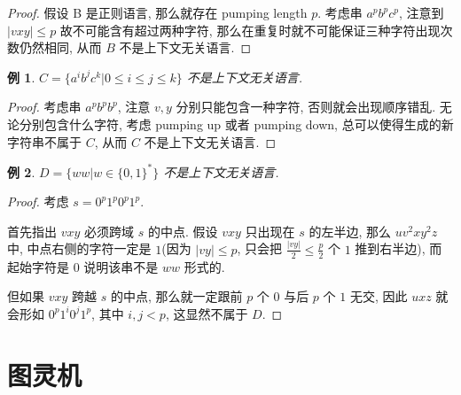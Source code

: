 \documentclass[8pt]{article}
\theoremstyle{compact}
\newtheorem{example}{例}
\def\le{\leqslant}
\begin{document}
\begin{proof}
	假设 B 是正则语言, 那么就存在 pumping length $p$. 考虑串 $a^pb^pc^p$, 注意到 $|vxy| \le p$ 故不可能含有超过两种字符, 那么在重复时就不可能保证三种字符出现次数仍然相同, 从而 $B$ 不是上下文无关语言.
\end{proof}
\begin{example}
	$C = \{a^ib^jc^k | 0 \le i \le j \le k\}$ 不是上下文无关语言.
\end{example}
\begin{proof}
	考虑串 $a^{p}b^{p}b^{p}$, 注意 $v, y$ 分别只能包含一种字符, 否则就会出现顺序错乱. 无论分别包含什么字符, 考虑 pumping up 或者 pumping down, 总可以使得生成的新字符串不属于 $C$, 从而 $C$ 不是上下文无关语言.
\end{proof}
\begin{example}
	$D = \{ww | w \in \{0, 1\}^*\}$ 不是上下文无关语言. 
\end{example}
\begin{proof}
	考虑 $s = 0^p1^p0^p1^p$. 

	首先指出 $vxy$ 必须跨域 $s$ 的中点. 假设 $vxy$ 只出现在 $s$ 的左半边, 那么 $uv^2xy^2z$ 中, 中点右侧的字符一定是 $1$(因为 $|vy| \le p$, 只会把 $\frac{|vy|}{2} \le \frac p2$ 个 $1$ 推到右半边), 而起始字符是 $0$ 说明该串不是 $ww$ 形式的. 

	但如果 $vxy$ 跨越 $s$ 的中点, 那么就一定跟前 $p$ 个 $0$ 与后 $p$ 个 $1$ 无交, 因此 $uxz$ 就会形如 $0^p1^i0^j1^p$, 其中 $i, j < p$, 这显然不属于 $D$.
\end{proof}

\newpage
\section{图灵机}
\end{document}
